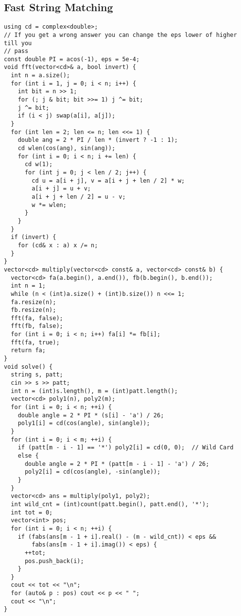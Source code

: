 \documentclass[twoside]{article}
\begin{document}
\begin{multicols*}{2}
{\subsection*{Fast String Matching}
}
\begin{verbatim}
using cd = complex<double>;
// If you get a wrong answer you can change the eps lower of higher till you
// pass
const double PI = acos(-1), eps = 5e-4;
void fft(vector<cd>& a, bool invert) {
  int n = a.size();
  for (int i = 1, j = 0; i < n; i++) {
    int bit = n >> 1;
    for (; j & bit; bit >>= 1) j ^= bit;
    j ^= bit;
    if (i < j) swap(a[i], a[j]);
  }
  for (int len = 2; len <= n; len <<= 1) {
    double ang = 2 * PI / len * (invert ? -1 : 1);
    cd wlen(cos(ang), sin(ang));
    for (int i = 0; i < n; i += len) {
      cd w(1);
      for (int j = 0; j < len / 2; j++) {
        cd u = a[i + j], v = a[i + j + len / 2] * w;
        a[i + j] = u + v;
        a[i + j + len / 2] = u - v;
        w *= wlen;
      }
    }
  }
  if (invert) {
    for (cd& x : a) x /= n;
  }
}
vector<cd> multiply(vector<cd> const& a, vector<cd> const& b) {
  vector<cd> fa(a.begin(), a.end()), fb(b.begin(), b.end());
  int n = 1;
  while (n < (int)a.size() + (int)b.size()) n <<= 1;
  fa.resize(n);
  fb.resize(n);
  fft(fa, false);
  fft(fb, false);
  for (int i = 0; i < n; i++) fa[i] *= fb[i];
  fft(fa, true);
  return fa;
}
void solve() {
  string s, patt;
  cin >> s >> patt;
  int n = (int)s.length(), m = (int)patt.length();
  vector<cd> poly1(n), poly2(m);
  for (int i = 0; i < n; ++i) {
    double angle = 2 * PI * (s[i] - 'a') / 26;
    poly1[i] = cd(cos(angle), sin(angle));
  }
  for (int i = 0; i < m; ++i) {
    if (patt[m - i - 1] == '*') poly2[i] = cd(0, 0);  // Wild Card
    else {
      double angle = 2 * PI * (patt[m - i - 1] - 'a') / 26;
      poly2[i] = cd(cos(angle), -sin(angle));
    }
  }
  vector<cd> ans = multiply(poly1, poly2);
  int wild_cnt = (int)count(patt.begin(), patt.end(), '*');
  int tot = 0;
  vector<int> pos;
  for (int i = 0; i < n; ++i) {
    if (fabs(ans[m - 1 + i].real() - (m - wild_cnt)) < eps &&
        fabs(ans[m - 1 + i].imag()) < eps) {
      ++tot;
      pos.push_back(i);
    }
  }
  cout << tot << "\n";
  for (auto& p : pos) cout << p << " ";
  cout << "\n";
}
\end{verbatim}

{
}
\end{multicols*}
\end{document}
